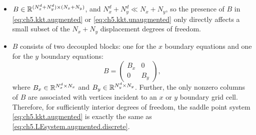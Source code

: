 \begin{itemize}

\item $B \in \mathbb{R}^{(N^d_x + N^d_y) \times (N_x + N_y)}$, and $N^d_x + N^d_y \ll N_x + N_y$, so the presence of $B$ in \eqref{eq:ch5.kkt.augmented} or \eqref{eq:ch5.kkt.unaugmented} only directly affects a small subset of the $N_x + N_y$ displacement degrees of freedom.

\item $B$ consists of two decoupled blocks: one for the $x$ boundary equations and one for the $y$ boundary equations:
\begin{equation} \label{eq:ch5.BxBy}
B = \begin{pmatrix} B_x & 0 \\ 0 & B_y \end{pmatrix},
\end{equation}
where $B_x \in \mathbb{R}^{N^d_x \times N_x}$ and $B_y \in \mathbb{R}^{N^d_y \times N_y}$. Further, the only nonzero columns of $B$ are associated with vertices incident to an $x$ or $y$ boundary grid cell. Therefore, for sufficiently interior degrees of freedom, the saddle point system \eqref{eq:ch5.kkt.augmented} is exactly the same as \eqref{eq:ch5.LEsystem.augmented.discrete}.

\end{itemize}

